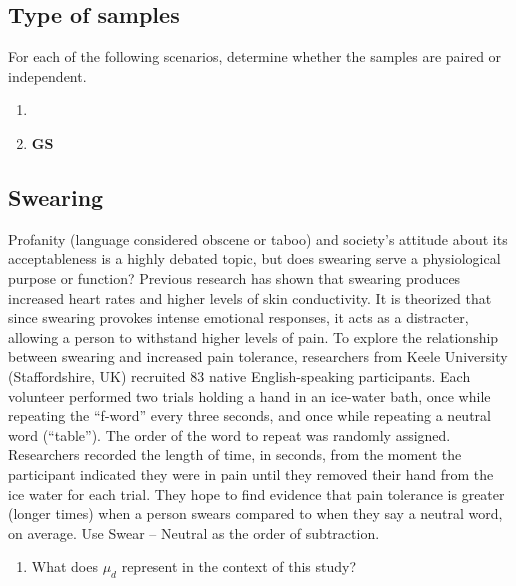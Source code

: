 \documentclass[
]{report}
\providecommand{\tightlist}{%
  \setlength{\itemsep}{0pt}\setlength{\parskip}{0pt}}
\begin{document}
\hypertarget{type-of-samples}{%
\subsection{Type of samples}\label{type-of-samples}}

For each of the following scenarios, determine whether the samples are paired or independent.

\begin{enumerate}
\def\labelenumi{\arabic{enumi}.}
\tightlist
\item
\item
  \textbf{GS }
\end{enumerate}

\hypertarget{swearing}{%
\subsection{Swearing}\label{swearing}}

Profanity (language considered obscene or taboo) and society's attitude about its acceptableness is a highly debated topic, but does swearing serve a physiological purpose or function? Previous research has shown that swearing produces increased heart rates and higher levels of skin conductivity. It is theorized that since swearing provokes intense emotional responses, it acts as a distracter, allowing a person to withstand higher levels of pain. To explore the relationship between swearing and increased pain tolerance, researchers from Keele University (Staffordshire, UK) recruited 83 native English-speaking participants. Each volunteer performed two trials holding a hand in an ice-water bath, once while repeating the ``f-word'' every three seconds, and once while repeating a neutral word (``table''). The order of the word to repeat was randomly assigned. Researchers recorded the length of time, in seconds, from the moment the participant indicated they were in pain until they removed their hand from the ice water for each trial. They hope to find evidence that pain tolerance is greater (longer times) when a person swears compared to when they say a neutral word, on average. Use Swear -- Neutral as the order of subtraction.

\begin{enumerate}
\def\labelenumi{\arabic{enumi}.}
\setcounter{enumi}{3}
\tightlist
\item
  What does \(\mu_d\) represent in the context of this study?
\end{enumerate}
\end{document}
